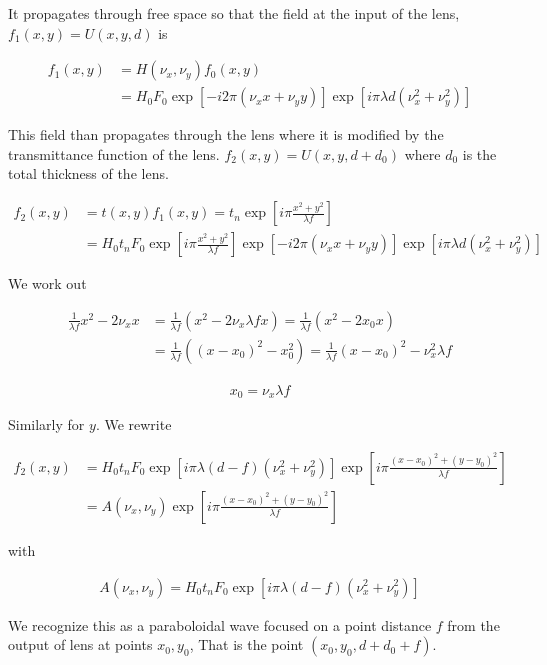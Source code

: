 \documentclass[12pt]{article}
\begin{document}
It propagates through free space so that the field at the input of the lens, $f_1(x,y) = U(x,y,d)$ is

\begin{align}
f_1(x,y) &= H(\nu_x, \nu_y) f_0(x,y)\\
&=H_0 F_0 \exp[-i2\pi(\nu_x x + \nu_y y)] \exp[i\pi \lambda d(\nu_x^2+\nu_y^2)]
\end{align}

This field than propagates through the lens where it is modified by the transmittance function of the lens. $f_2(x,y) = U(x,y,d+d_0)$ where $d_0$ is the total thickness of the lens.

\begin{align}
f_2(x,y) &= t(x,y) f_1(x,y) = t_n \exp \left[i\pi \frac{x^2+y^2}{\lambda f}\right]\\
&= H_0 t_n F_0 \exp \left[i\pi \frac{x^2+y^2}{\lambda f}\right] \exp[-i2\pi(\nu_x x + \nu_y y)] \exp[i\pi \lambda d(\nu_x^2+\nu_y^2)]
\end{align}

We work out

\begin{align}
\frac{1}{\lambda f} x^2 - 2\nu_x x &= \frac{1}{\lambda f}(x^2 - 2 \nu_x \lambda f x) = \frac{1}{\lambda f}(x^2 - 2 x_0 x)\\
&= \frac{1}{\lambda f}((x-x_0)^2 - x_0^2) = \frac{1}{\lambda f}(x-x_0)^2 - \nu_x^2 \lambda f
\end{align}

\begin{align}
x_0 = \nu_x \lambda f
\end{align}

Similarly for $y$. We rewrite

\begin{align}
f_2(x,y) &= H_0 t_n F_0 \exp\left[i\pi \lambda(d-f)(\nu_x^2+\nu_y^2)
\right] \exp\left[i \pi\frac{(x-x_0)^2 + (y-y_0)^2}{\lambda f}\right]\\
&= A(\nu_x, \nu_y) \exp\left[i \pi\frac{(x-x_0)^2 + (y-y_0)^2}{\lambda f}\right]
\end{align}

with

\begin{align}
A(\nu_x, \nu_y) = H_0 t_n F_0 \exp\left[i\pi \lambda(d-f)(\nu_x^2+\nu_y^2)
\right] 
\end{align}

We recognize this as a paraboloidal wave focused on a point distance $f$ from the output of lens at points $x_0, y_0$, That is the point $(x_0, y_0, d+d_0+f)$.
\end{document}
